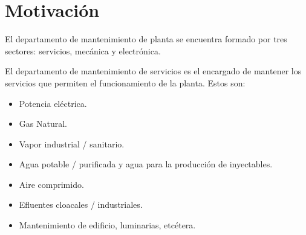 





\section{Motivación}

El departamento de mantenimiento de planta se encuentra formado por tres sectores: servicios, mecánica y electrónica.

El departamento de mantenimiento de servicios es el encargado de mantener los servicios que permiten el funcionamiento de la planta. Estos son:

\begin{itemize}
	\item Potencia eléctrica.
	\item Gas Natural.
	\item Vapor industrial / sanitario.
	\item Agua potable / purificada y agua para la producción de inyectables.
	\item Aire comprimido.
	\item Efluentes cloacales / industriales.
	\item Mantenimiento de edificio, luminarias, etcétera.
\end{itemize}

